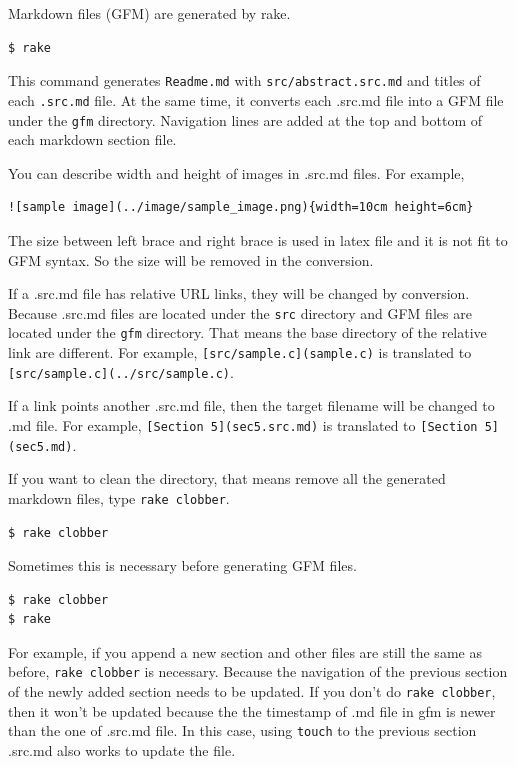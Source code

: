 Markdown files (GFM) are generated by rake.

\begin{verbatim}
$ rake
\end{verbatim}

This command generates \texttt{Readme.md} with
\texttt{src/abstract.src.md} and titles of each \texttt{.src.md} file.
At the same time, it converts each .src.md file into a GFM file under
the \texttt{gfm} directory. Navigation lines are added at the top and
bottom of each markdown section file.

You can describe width and height of images in .src.md files. For
example,

\begin{verbatim}
![sample image](../image/sample_image.png){width=10cm height=6cm}
\end{verbatim}

The size between left brace and right brace is used in latex file and it
is not fit to GFM syntax. So the size will be removed in the conversion.

If a .src.md file has relative URL links, they will be changed by
conversion. Because .src.md files are located under the \texttt{src}
directory and GFM files are located under the \texttt{gfm} directory.
That means the base directory of the relative link are different. For
example, \texttt{{[}src/sample.c{]}(sample.c)} is translated to
\texttt{{[}src/sample.c{]}(../src/sample.c)}.

If a link points another .src.md file, then the target filename will be
changed to .md file. For example, \texttt{{[}Section\ 5{]}(sec5.src.md)}
is translated to \texttt{{[}Section\ 5{]}(sec5.md)}.

If you want to clean the directory, that means remove all the generated
markdown files, type \texttt{rake\ clobber}.

\begin{verbatim}
$ rake clobber
\end{verbatim}

Sometimes this is necessary before generating GFM files.

\begin{verbatim}
$ rake clobber
$ rake
\end{verbatim}

For example, if you append a new section and other files are still the
same as before, \texttt{rake\ clobber} is necessary. Because the
navigation of the previous section of the newly added section needs to
be updated. If you don't do \texttt{rake\ clobber}, then it won't be
updated because the the timestamp of .md file in gfm is newer than the
one of .src.md file. In this case, using \texttt{touch} to the previous
section .src.md also works to update the file.

